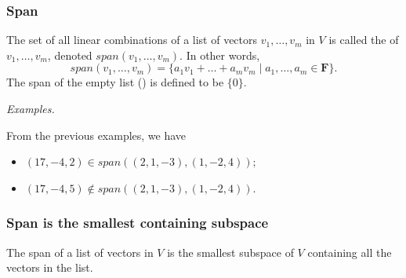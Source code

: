 \documentclass[11pt]{article}
\begin{document}
    \subsubsection{Span}

    The set of all linear combinations of a list of vectors \(v_1, \dots, v_m\) in $V$ is called the  of \(v_1, \dots, v_m\), denoted \(span(v_1,\dots,v_m)\). In other words, \[span(v_1,\dots,v_m) = \{a_1v_1 + \dots + a_m v_m \mid a_1, \dots, a_m \in \textbf{F}\}.\] The span of the empty list () is defined to be \(\{0\}\).

    \vspace{1em}

    \emph{Examples.}

    \vspace{1em}

    From the previous examples, we have
    \begin{itemize}
        \item \((17,-4,2) \in span((2,1,-3),(1,-2,4));\)
        \item \((17,-4,5) \notin span((2,1,-3),(1,-2,4)).\)
    \end{itemize}

    \subsubsection{Span is the smallest containing subspace}

    The span of a list of vectors in $V$ is the smallest subspace of $V$ containing all the vectors in the list.
\end{document}
